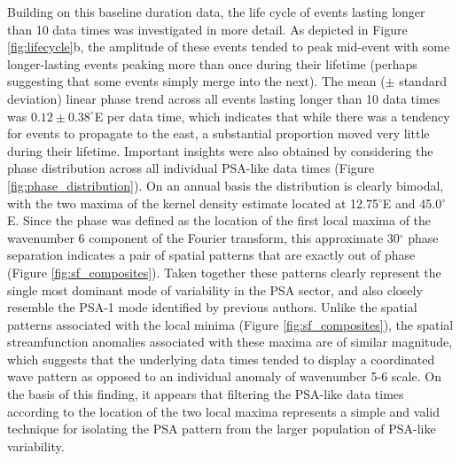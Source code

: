 Building on this baseline duration data, the life cycle of events lasting longer than 10 data times was investigated in more detail. As depicted in Figure \ref{fig:lifecycle}b, the amplitude of these events tended to peak mid-event with some longer-lasting events peaking more than once during their lifetime (perhaps suggesting that some events simply merge into the next). The mean ($\pm$ standard deviation) linear phase trend across all events lasting longer than 10 data times was $0.12 \pm 0.38^{\circ}$E per data time, which indicates that while there was a tendency for events to propagate to the east, a substantial proportion moved very little during their lifetime. Important insights were also obtained by considering the phase distribution across all individual PSA-like data times (Figure \ref{fig:phase_distribution}). On an annual basis the distribution is clearly bimodal, with the two maxima of the kernel density estimate located at 12.75$^{\circ}$E and 45.0$^{\circ}$E. Since the phase was defined as the location of the first local maxima of the wavenumber 6 component of the Fourier transform, this approximate 30$^{\circ}$ phase separation indicates a pair of spatial patterns that are exactly out of phase (Figure \ref{fig:sf_composites}). Taken together these patterns clearly represent the single most dominant mode of variability in the PSA sector, and also closely resemble the PSA-1 mode identified by previous authors. Unlike the spatial patterns associated with the local minima (Figure \ref{fig:sf_composites}), the spatial streamfunction anomalies associated with these maxima are of similar magnitude, which suggests that the underlying data times tended to display a coordinated wave pattern as opposed to an individual anomaly of wavenumber 5-6 scale. On the basis of this finding, it appears that filtering the PSA-like data times according to the location of the two local maxima represents a simple and valid technique for isolating the PSA pattern from the larger population of PSA-like variability. 

